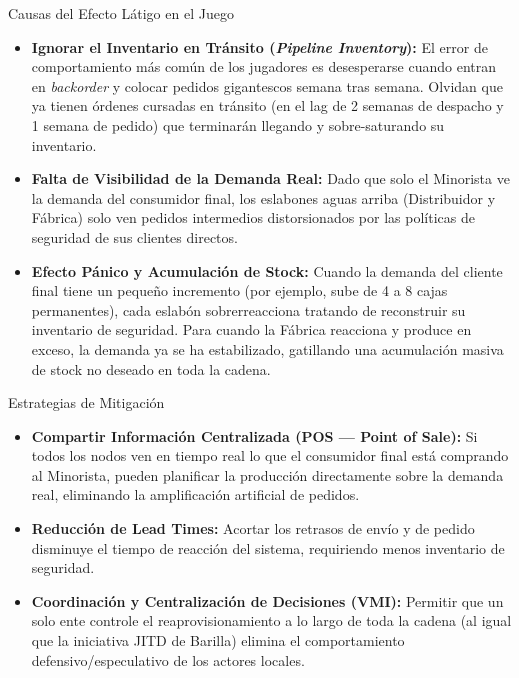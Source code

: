 \begin{definicion}{Causas del Efecto Látigo en el Juego}
  \begin{itemize}[leftmargin=1.4em, itemsep=2pt]
    \item \textbf{Ignorar el Inventario en Tránsito (\textit{Pipeline Inventory}):} El error de comportamiento más común de los jugadores es desesperarse cuando entran en \textit{backorder} y colocar pedidos gigantescos semana tras semana. Olvidan que ya tienen órdenes cursadas en tránsito (en el lag de 2 semanas de despacho y 1 semana de pedido) que terminarán llegando y sobre-saturando su inventario.
    \item \textbf{Falta de Visibilidad de la Demanda Real:} Dado que solo el Minorista ve la demanda del consumidor final, los eslabones aguas arriba (Distribuidor y Fábrica) solo ven pedidos intermedios distorsionados por las políticas de seguridad de sus clientes directos.
    \item \textbf{Efecto Pánico y Acumulación de Stock:} Cuando la demanda del cliente final tiene un pequeño incremento (por ejemplo, sube de 4 a 8 cajas permanentes), cada eslabón sobrerreacciona tratando de reconstruir su inventario de seguridad. Para cuando la Fábrica reacciona y produce en exceso, la demanda ya se ha estabilizado, gatillando una acumulación masiva de stock no deseado en toda la cadena.
  \end{itemize}
\end{definicion}

\begin{definicion}{Estrategias de Mitigación}
  \begin{itemize}[leftmargin=1.4em, itemsep=2pt]
    \item \textbf{Compartir Información Centralizada (POS --- Point of Sale):} Si todos los nodos ven en tiempo real lo que el consumidor final está comprando al Minorista, pueden planificar la producción directamente sobre la demanda real, eliminando la amplificación artificial de pedidos.
    \item \textbf{Reducción de Lead Times:} Acortar los retrasos de envío y de pedido disminuye el tiempo de reacción del sistema, requiriendo menos inventario de seguridad.
    \item \textbf{Coordinación y Centralización de Decisiones (VMI):} Permitir que un solo ente controle el reaprovisionamiento a lo largo de toda la cadena (al igual que la iniciativa JITD de Barilla) elimina el comportamiento defensivo/especulativo de los actores locales.
  \end{itemize}
\end{definicion}

